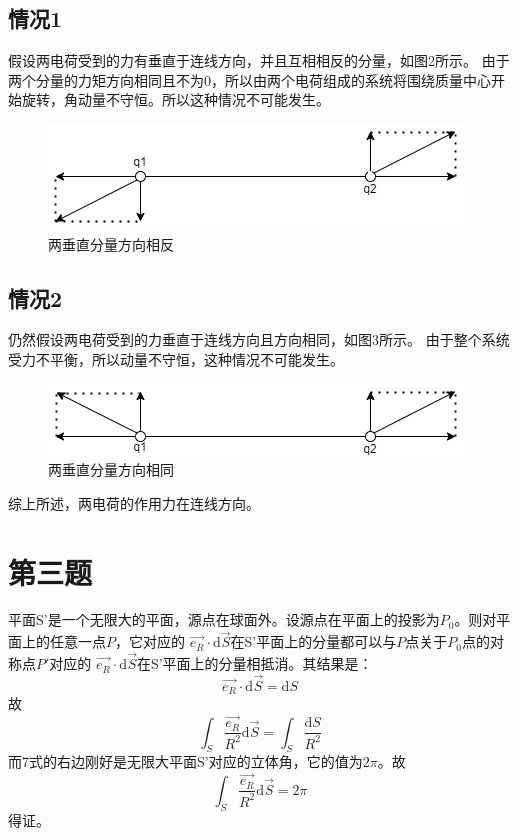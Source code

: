 \documentclass[a4paper]{article}
\begin{document}
		\subsection{情况1}
			假设两电荷受到的力有垂直于连线方向，并且互相相反的分量，如图2所示。
			由于两个分量的力矩方向相同且不为0，所以由两个电荷组成的系统将围绕质量中心开始旋转，角动量不守恒。所以这种情况不可能发生。
			\begin{figure}[htbp]
				\centering
				\includegraphics[scale=0.7]{2.1.png}
				\caption{两垂直分量方向相反}
			\end{figure}

		\subsection{情况2}
			仍然假设两电荷受到的力垂直于连线方向且方向相同，如图3所示。
			由于整个系统受力不平衡，所以动量不守恒，这种情况不可能发生。
			\begin{figure}[htbp]
				\centering
				\includegraphics[scale=0.7]{2.2.png}
				\caption{两垂直分量方向相同}
			\end{figure}

		综上所述，两电荷的作用力在连线方向。

	\section{第三题}
		平面S'是一个无限大的平面，源点在球面外。设源点在平面上的投影为$P_0$。则对平面上的任意一点$P$，它对应的
		$\vec{e_R}\cdot\mathrm{d}\vec{S}$在S'平面上的分量都可以与$P$点关于$P_0$点的对称点$P'$对应的
		$\vec{e_R}\cdot\mathrm{d}\vec{S}$在S'平面上的分量相抵消。其结果是：
		\begin{equation}
			\vec{e_R}\cdot\mathrm{d}\vec{S} = \mathrm{d}S
		\end{equation}
		故
		\begin{equation}
			\int_S \frac{\vec{e_R}}{R^2} \mathrm{d}\vec{S} = \int_S \frac{\mathrm{d}S}{R^2}
		\end{equation}
		而7式的右边刚好是无限大平面S'对应的立体角，它的值为$2\pi$。故
		\begin{equation}
			\int_S \frac{\vec{e_R}}{R^2} \mathrm{d}\vec{S} = 2\pi
		\end{equation}
		得证。
\end{document}
